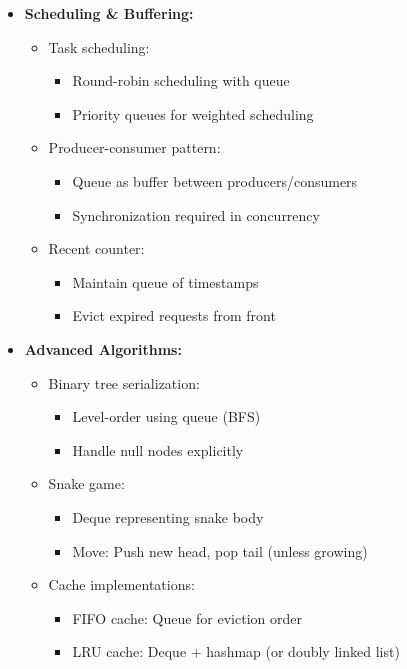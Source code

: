 \documentclass[a4paper,10pt]{book}
\begin{document}
\begin{itemize}
    \item \textbf{Scheduling \& Buffering:}
    \begin{itemize}
        \item Task scheduling:
        \begin{itemize}
            \item Round-robin scheduling with queue
            \item Priority queues for weighted scheduling
        \end{itemize}
        \item Producer-consumer pattern:
        \begin{itemize}
            \item Queue as buffer between producers/consumers
            \item Synchronization required in concurrency
        \end{itemize}
        \item Recent counter:
        \begin{itemize}
            \item Maintain queue of timestamps
            \item Evict expired requests from front
        \end{itemize}
    \end{itemize}
    
    \item \textbf{Advanced Algorithms:}
    \begin{itemize}
        \item Binary tree serialization:
        \begin{itemize}
            \item Level-order using queue (BFS)
            \item Handle null nodes explicitly
        \end{itemize}
        \item Snake game:
        \begin{itemize}
            \item Deque representing snake body
            \item Move: Push new head, pop tail (unless growing)
        \end{itemize}
        \item Cache implementations:
        \begin{itemize}
            \item FIFO cache: Queue for eviction order
            \item LRU cache: Deque + hashmap (or doubly linked list)
        \end{itemize}
    \end{itemize}
    

\end{itemize}
\end{document}
